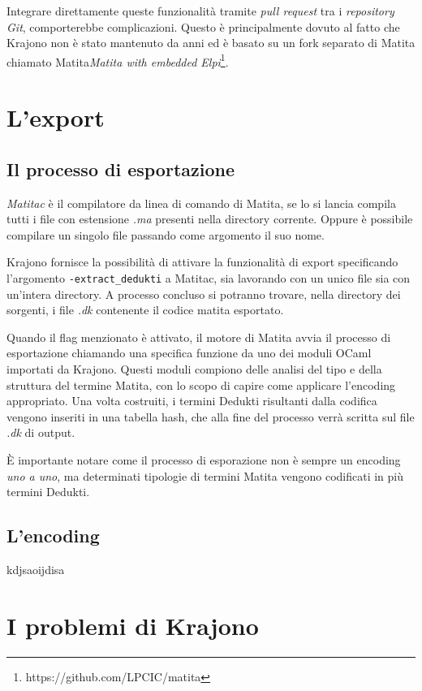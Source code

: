 \documentclass[12pt,a4paper]{mimosis}
\begin{document}
Integrare direttamente queste funzionalità tramite \textit{pull request} tra
i \textit{repository Git}, comporterebbe complicazioni. Questo
è principalmente dovuto al fatto che Krajono non è stato mantenuto da anni ed
è basato su un fork separato di Matita chiamato Matita\textit{Matita with embedded
Elpi}\footnote{https://github.com/LPCIC/matita}. 


\section{L'export}
\subsection{Il processo di esportazione}
\textit{Matitac} è il compilatore da linea di comando di Matita, se lo si lancia
compila tutti i file con estensione \textit{.ma} presenti nella directory corrente. 
Oppure è possibile compilare un singolo file passando come argomento il suo
nome.

Krajono fornisce la possibilità di attivare la funzionalità di export specificando l'argomento \texttt{-extract\_dedukti} a Matitac,
sia lavorando con un unico file sia con un'intera directory. A processo concluso 
si potranno trovare, nella directory dei sorgenti, i file \textit{.dk} contenente
il codice matita esportato.

Quando il flag menzionato è attivato, il motore di Matita avvia il processo di
esportazione chiamando una specifica funzione da uno dei moduli OCaml importati
da Krajono. Questi moduli compiono delle analisi del tipo e della struttura del
termine Matita, con lo scopo di capire come applicare l'encoding appropriato.
Una volta costruiti, i termini Dedukti risultanti dalla codifica vengono inseriti
in una tabella hash, che alla fine del processo verrà scritta sul file \textit{.dk}
di output.

È importante notare come il processo di esporazione non è sempre un encoding
\textit{uno a uno}, ma determinati tipologie di termini Matita vengono codificati
in più termini Dedukti.

\subsection{L'encoding}\label{sottoSezioneEncoding}
kdjsaoijdisa

\section{I problemi di Krajono}\label{sezioneProblemiKrajono}
\end{document}
